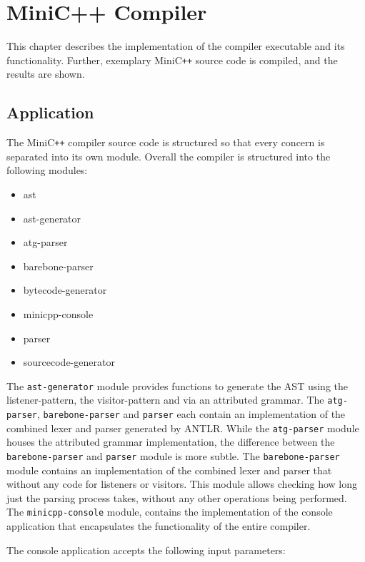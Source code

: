 \chapter{MiniC++ Compiler}

This chapter describes the implementation of the compiler executable and its functionality. Further, exemplary MiniC\verb|++| source code is compiled, and the results are shown. 

\section{Application}

The MiniC\verb|++| compiler source code is structured so that every concern is separated into its own module. Overall the compiler is structured into the following modules:

\begin{itemize}
    \item ast
    \item ast-generator
    \item atg-parser
    \item barebone-parser
    \item bytecode-generator
    \item minicpp-console
    \item parser
    \item sourcecode-generator
\end{itemize}

The \verb|ast-generator| module provides functions to generate the AST using the listener-pattern, the visitor-pattern and via an attributed grammar. The \verb|atg-parser|, \verb|barebone-parser| and \verb|parser| each contain an implementation of the combined lexer and parser generated by ANTLR. While the \verb|atg-parser| module houses the attributed grammar implementation, the difference between the \verb|barebone-parser| and \verb|parser| module is more subtle. The \verb|barebone-parser| module contains an implementation of the combined lexer and parser that without any code for listeners or visitors. This module allows checking how long just the parsing process takes, without any other operations being performed. The \verb|minicpp-console| module, contains the implementation of the console application that encapsulates the functionality of the entire compiler. 

The console application accepts the following input parameters:

